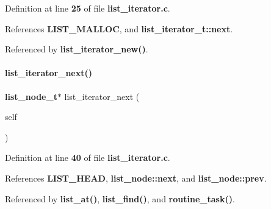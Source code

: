Definition at line \textbf{ 25} of file \textbf{ list\+\_\+iterator.\+c}.



References \textbf{ L\+I\+S\+T\+\_\+\+M\+A\+L\+L\+OC}, and \textbf{ list\+\_\+iterator\+\_\+t\+::next}.



Referenced by \textbf{ list\+\_\+iterator\+\_\+new()}.

\mbox{\label{list__iterator_8c_a2e5db981e32d3aef49ea79505a0615a6}} 
\paragraph{list\+\_\+iterator\+\_\+next()}
{\footnotesize\ttfamily \textbf{ list\+\_\+node\+\_\+t}$\ast$ list\+\_\+iterator\+\_\+next (\begin{DoxyParamCaption}\item[{\textbf{ list\+\_\+iterator\+\_\+t} $\ast$}]{self }\end{DoxyParamCaption})}



Definition at line \textbf{ 40} of file \textbf{ list\+\_\+iterator.\+c}.



References \textbf{ L\+I\+S\+T\+\_\+\+H\+E\+AD}, \textbf{ list\+\_\+node\+::next}, and \textbf{ list\+\_\+node\+::prev}.



Referenced by \textbf{ list\+\_\+at()}, \textbf{ list\+\_\+find()}, and \textbf{ routine\+\_\+task()}.

